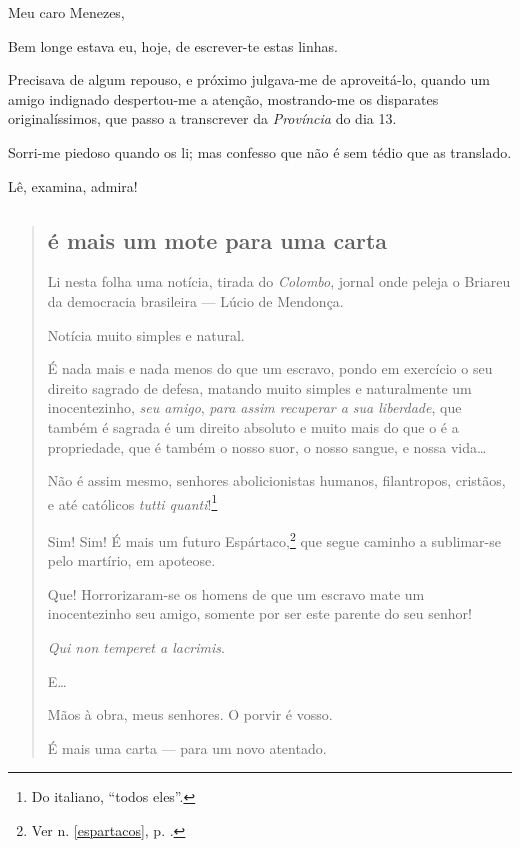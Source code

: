 {Meu caro Menezes,

Bem longe estava eu, hoje, de escrever-te estas linhas.

Precisava de algum repouso, e próximo julgava-me de aproveitá-lo, quando
um amigo indignado despertou-me a atenção, mostrando-me os disparates
originalíssimos, que passo a transcrever da \emph{Província} do dia 13.

Sorri-me piedoso quando os li; mas confesso que não é sem tédio que as
translado.

Lê, examina, admira!

\begin{quote}
\subsection{é mais um mote para uma carta}

Li nesta folha uma notícia, tirada do \emph{Colombo}, jornal onde peleja 
o Briareu da democracia brasileira --- Lúcio de Mendonça.

Notícia muito simples e natural.

É nada mais e nada menos do que um escravo, pondo em exercício o seu
direito sagrado de defesa, matando muito simples e naturalmente um
inocentezinho, \emph{seu amigo}, \emph{para assim recuperar a sua
liberdade}, que também é sagrada é um direito absoluto e muito mais do
que o é a propriedade, que é também o nosso suor, o nosso sangue, e
nossa vida\ldots{}

Não é assim mesmo, senhores abolicionistas humanos, filantropos,
cristãos, e até católicos \emph{tutti quanti}!\footnote{Do italiano,
  ``todos eles''.}

\noindent\dotfill{}

Sim! Sim! É mais um futuro Espártaco,\footnote{Ver n. \ref{espartacos}, p. \pageref{espartacos}.} que segue caminho a sublimar-se pelo martírio, em
apoteose.

Que! Horrorizaram-se os homens de que um escravo mate um inocentezinho
seu amigo, somente por ser este parente do seu senhor!

\emph{Qui non temperet a lacrimis}.

E\ldots{}

Mãos à obra, meus senhores. O porvir é vosso.

É mais uma carta --- para um novo atentado.


\end{quote}}

